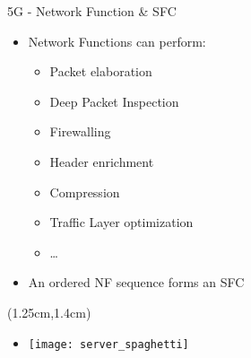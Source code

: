 \begin{frame}{5G - Network Function \& SFC}

  \begin{itemize}
  \item[]<1-> Network Functions can perform:
    \begin{itemize}
    \item<2-> Packet elaboration
    \item<3-> Deep Packet Inspection
    \item<4-> Firewalling
    \item<5-> Header enrichment
    \item<6-> Compression
    \item<7-> Traffic Layer optimization
    \item<8-> \dots
    \end{itemize}
  \item[]<9-> An ordered NF sequence forms an SFC

  \end{itemize}

  \begin{textblock*}{5cm}(1.25cm,1.4cm)
    \begin{itemize}
      \item[]<10-> \texttt{[image: server\_spaghetti]}
    \end{itemize}
  \end{textblock*}
\end{frame}

